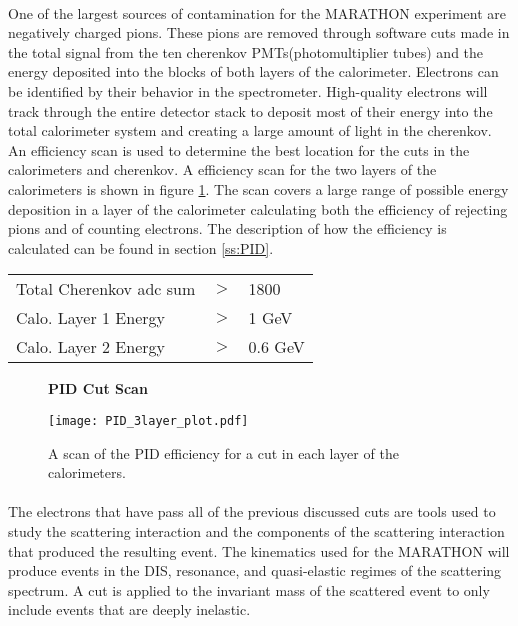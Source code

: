 \paragraph{}One of the largest sources of contamination for the MARATHON experiment are negatively charged pions. These pions are removed through software cuts made in the total signal from the ten cherenkov PMTs(photomultiplier tubes) and the energy deposited into the blocks of both layers of the calorimeter. Electrons can be identified by their behavior in the spectrometer. High-quality electrons will track through the entire detector stack to deposit most of their energy into the total calorimeter system and creating a large amount of light in the cherenkov. An efficiency scan is used to determine the best location for the cuts in the calorimeters and cherenkov. A efficiency scan for the two layers of the calorimeters is shown in figure \ref{cal_pidscan}. The scan covers a large range of possible energy deposition in a layer of the calorimeter calculating both the efficiency of rejecting pions and of counting electrons. The description of how the efficiency is calculated can be found in section \ref{ss:PID}.

\begin{tabular}{@{$\bullet$ }lll}
	Total Cherenkov adc sum &$>$ &1800\\
	Calo. Layer 1 Energy &$>$ & 1 GeV\\
	Calo. Layer 2 Energy &$>$ & 0.6 GeV
\end{tabular}

\begin{figure}[]
	\centering
	\textbf{PID Cut Scan }\par\medskip
	\texttt{[image: PID\_3layer\_plot.pdf]}
	\caption{ A scan of the PID efficiency for a cut in each layer of the calorimeters.}
	\label{cal_pidscan}
\end{figure}

\paragraph{}The electrons that have pass all of the previous discussed cuts are tools used to study the scattering interaction and the components of the scattering interaction that produced the resulting event. The kinematics used for the MARATHON will produce events in the DIS, resonance, and quasi-elastic regimes of the scattering spectrum. A cut is applied to the invariant mass of the scattered event to only include events that are deeply inelastic. 

